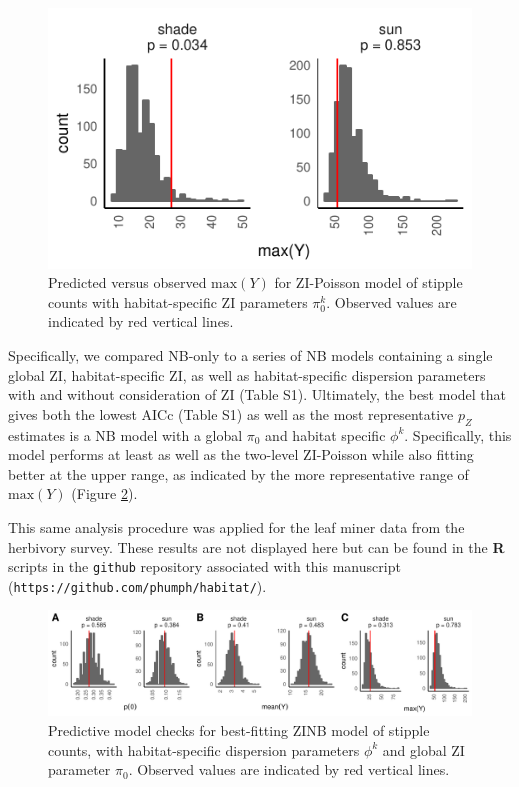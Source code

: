 \documentclass[11pt, oneside]{amsart}
\newcommand{\lib}[1]{\texttt{#1}}
\begin{document}
\begin{figure}[!t]
\begin{center}
\includegraphics[scale = 0.8]{POIS_stip_2_max}
\caption{Predicted versus observed $\text{max}(Y)$ for ZI-Poisson model of stipple counts with habitat-specific ZI parameters $\pi^{k}_0$. Observed values are indicated by red vertical lines.}
\label{fig:six}
\end{center}
\end{figure}

Specifically, we compared NB-only to a series of NB models containing a single global ZI, habitat-specific ZI, as well as habitat-specific dispersion parameters with and without consideration of ZI (Table S1). Ultimately, the best model that gives both the lowest AICc (Table S1) as well as the most representative $p_Z$ estimates is a NB model with a global $\pi_0$ and habitat specific $\phi^k$. Specifically, this model performs at least as well as the two-level ZI-Poisson while also fitting better at the upper range, as indicated by the more representative range of $\text{max}(Y)$ (Figure \ref{fig:seven}).

This same analysis procedure was applied for the leaf miner data from the herbivory survey. These results are not displayed here but can be found in the \textbf{R} scripts in the \lib{github} repository associated with this manuscript (\lib{https://github.com/phumph/habitat/}).

\begin{figure}[!h]
\begin{center}
\includegraphics[scale = 0.7]{pp_stips_best_mod}
\caption{Predictive model checks for best-fitting ZINB model of stipple counts, with habitat-specific dispersion parameters $\phi^k$ and global ZI parameter $\pi_0$. Observed values are indicated by red vertical lines.}
\label{fig:seven}
\end{center}
\end{figure}
\end{document}
